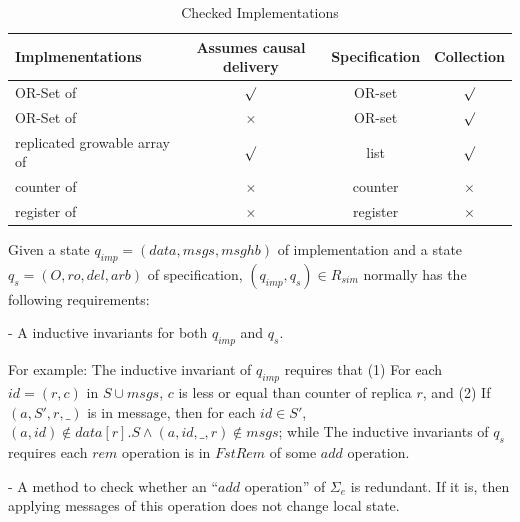 \begin{table}[h]
	\centering
	\begin{tabular}{|l|c|c|c|}\hline
        Implmenentations&Assumes causal delivery&Specification&Collection\\\hline
		OR-Set of \cite{Shapiro:2011} &  $\surd$ & OR-set & $\surd$\\
		OR-Set of \cite{Bieniusa:2012} & $\times$ & OR-set & $\surd$\\
        replicated growable array of \cite{Attiya:2016} & $\surd$ & list & $\surd$\\
        counter of \cite{Shapiro:2011} &  $\times$ & counter & $\times$\\
        register of \cite{Shapiro:2011} &  $\times$ & register & $\times$\\\hline
	\end{tabular}
	\caption{Checked Implementations}
	\label{tab:checked implementations}
\end{table}

Given a state $q_{\mathit{imp}} = (\mathit{data},\mathit{msgs},\mathit{msghb})$ of implementation and a state $q_s = (O,\mathit{ro},\mathit{del},\mathit{arb})$ of specification, $(q_{\mathit{imp}},q_s) \in R_{\mathit{sim}}$ normally has the following requirements:

\noindent - A inductive invariants for both $q_{\mathit{imp}}$ and $q_s$. %

For example: The inductive invariant of $q_{\mathit{imp}}$ requires that (1) For each $\mathit{id} = (r,c)$ in $S \cup \mathit{msgs}$, $c$ is less or equal than counter of replica $r$, and (2) If $(a,S',r,\_)$ is in message, then for each $\mathit{id} \in S'$, $(a,\mathit{id}) \notin \mathit{data}[r].S \wedge (a,\mathit{id},\_,r) \notin \mathit{msgs}$; while The inductive invariants of $q_s$ requires each $\mathit{rem}$ operation is in $\mathit{FstRem}$ of some $\mathit{add}$ operation.

\noindent - A method to check whether an ``$\mathit{add}$ operation'' of $\Sigma_e$ is redundant. If it is, then applying messages of this operation does not change local state.

